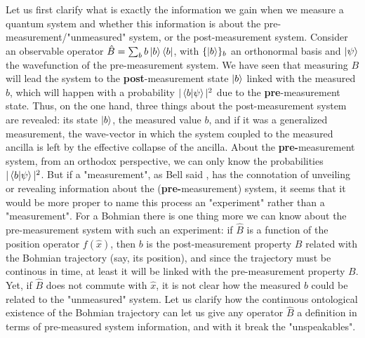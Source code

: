\documentclass[11pt, a4paper]{article} %
\begin{document}
Let us first clarify what is exactly the information we gain when we measure a quantum system and whether this information is about the pre-measurement/"unmeasured" system, or the post-measurement system. Consider an observable operator $\hat{B}=\sum_b b\ket{b}\bra{b}$, with $\{\ket{b}\}_b$ an orthonormal basis and $\ket{\psi}$ the wavefunction of the pre-measurement system. We have seen that measuring $B$ will lead the system to the {\bf post}-measurement state $\ket{b}$ linked with the measured $b$, which will happen with a probability $|\bra{b}\ket{\psi}|^2$ due to the {\bf pre}-measurement state. Thus, on the one hand, three things about the post-measurement system are revealed: its state $\ket{b}$, the measured value $b$, and if it was a generalized measurement, the wave-vector in which the system coupled to the measured ancilla is left by the effective collapse of the ancilla. About the {\bf pre-}measurement system, from an orthodox perspective, we can only know the probabilities $|\bra{b}\ket{\psi}|^2$. But if a "measurement", as Bell said \cite{Bell}, has the connotation of unveiling or revealing information about the ({\bf pre-}measurement) system, it seems that it would be more proper to name this process an "experiment" rather than a "measurement". For a Bohmian there is one thing more we can know about the pre-measurement system with such an experiment: if $\hat{B}$ is a function of the position operator $f(\hat{x})$, then $b$ is the post-measurement property $B$ related with the Bohmian trajectory (say, its position), and since the trajectory must be continous in time, at least it will be linked with the pre-measurement property $B$. Yet, if $\hat{B}$ does not commute with $\hat{x}$, it is not clear how the measured $b$ could be related to the "unmeasured" system. Let us clarify how the continuous ontological existence of the Bohmian trajectory can let us give any operator $\hat{B}$ a definition in terms of pre-measured system information, and with it break the "unspeakables".
\end{document}
